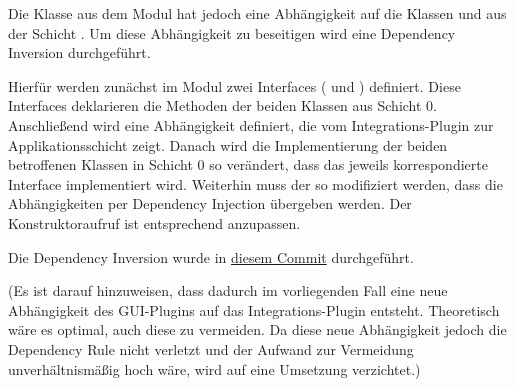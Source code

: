 Die Klasse  aus dem Modul \href{https://github.com/yschiebelhut/carpool-java/tree/6432a12f748682770324464219113f8df8e90454/2-carpool-java-application}{} hat jedoch eine Abhängigkeit auf die Klassen  und  aus der Schicht \href{https://github.com/yschiebelhut/carpool-java/tree/6432a12f748682770324464219113f8df8e90454/0-carpool-java-integration}{}.
Um diese Abhängigkeit zu beseitigen wird eine Dependency Inversion durchgeführt.

Hierfür werden zunächst im Modul  zwei Interfaces ( und ) definiert.
Diese Interfaces deklarieren die Methoden der beiden Klassen aus Schicht 0.
Anschließend wird eine Abhängigkeit definiert, die vom Integrations-Plugin zur Applikationsschicht zeigt.
Danach wird die Implementierung der beiden betroffenen Klassen in Schicht 0 so verändert, dass das jeweils korrespondierte Interface implementiert wird.
Weiterhin muss der  so modifiziert werden, dass die Abhängigkeiten per Dependency Injection übergeben werden.
Der Konstruktoraufruf ist entsprechend anzupassen.

Die Dependency Inversion wurde in \href{https://github.com/yschiebelhut/carpool-java/commit/de8af27645d16a68f174a517454a6353925ae821}{diesem Commit} durchgeführt.

(Es ist darauf hinzuweisen, dass dadurch im vorliegenden Fall eine neue Abhängigkeit des GUI-Plugins auf das Integrations-Plugin entsteht.
Theoretisch wäre es optimal, auch diese zu vermeiden.
Da diese neue Abhängigkeit jedoch die Dependency Rule nicht verletzt und der Aufwand zur Vermeidung unverhältnismäßig hoch wäre, wird auf eine Umsetzung verzichtet.)